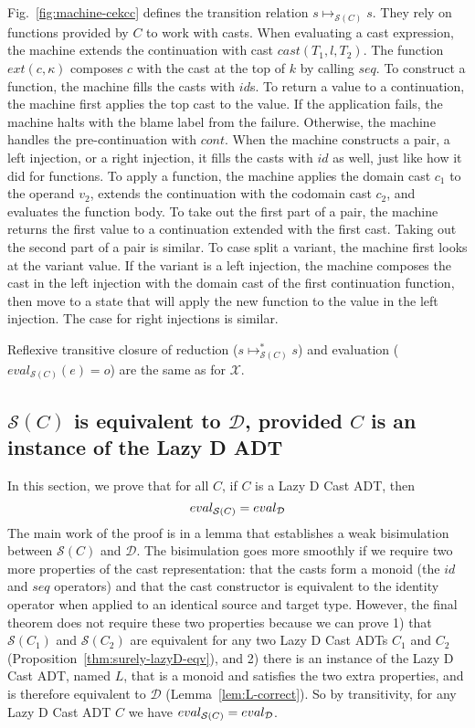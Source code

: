 \documentclass[acmsmall,review,anonymous]{acmart}\settopmatter{printfolios=true,printccs=false,printacmref=false}
\newcommand{\figref}[1]{Fig.~\ref{#1}}
\newcommand{\judgeSreduce}[3]{#2 \longmapsto_{\mathcal{S}(#1)} #3}
\newcommand{\judgeSreduceTrans}[3]{#2 \longmapsto_{\mathcal{S}(#1)}^{*} #3}
\newcommand{\judgeSeval}[3]{eval_{\mathcal{S}(#1)}(#2) = #3}
\newcommand{\ineffCEK}{\ensuremath{\mathcal{X}}}
\newcommand{\ineffCEKD}{\ensuremath{\mathcal{D}}}
\newcommand{\effCEK}[1]{\ensuremath{\mathcal{S}(#1)}}
\newcommand{\evalEqv}[2]{\ensuremath{eval_{\text{#1}} = eval_{\text{#2}}}}
\begin{document}
\figref{fig:machine-cekcc} defines the transition relation 
$\judgeSreduce{C}{s}{s}$. They rely on functions provided 
by $C$ to work with casts.
%
When evaluating a cast expression, the machine extends the continuation with 
cast $cast(T_1,l,T_2)$. The function $ext(c,\kappa)$ composes $c$ with the cast 
at the top of $k$ by calling $seq$.
%
To construct a function, the machine fills the casts with $id$s.
%
To return a value to a continuation, the machine first applies the top cast to 
the value. If the application fails, the machine halts with the blame label 
from the failure. Otherwise, the machine handles the pre-continuation with 
$cont$.
%
When the machine constructs a pair, a left injection, or a right injection, it 
fills the casts with $id$ as well, just like how it did for functions. 
%
To apply a function, the machine applies the domain cast $c_1$ to the 
operand $v_2$, extends the continuation with the codomain cast $c_2$, and 
evaluates the function body.
%
To take out the first part of a pair, the machine returns the first value to a 
continuation extended with the first cast. Taking out the second 
part of a pair is similar.
%
To case split a variant, the machine first looks at the variant value. If the 
variant is a left injection, the machine composes the cast in the left 
injection with the domain cast of the first continuation function, then move 
to a state that will apply the new function to the value in the left injection.
The case for right injections is similar.

Reflexive transitive closure of reduction ($\judgeSreduceTrans{C}{s}{s}$) and
evaluation ($\judgeSeval{C}{e}{o}$) are the same as for \ineffCEK.

\subsection{\effCEK{C} is equivalent to \ineffCEKD{}, provided $C$ is an instance of the Lazy D ADT}
\label{secc:framework:monoid-correct}

In this section, we prove that for all $C$, if $C$ is a Lazy D Cast
ADT, then
\[
  \evalEqv{\effCEK{C}}{\ineffCEKD}
\]
The main work of the proof is in a lemma that establishes a weak
bisimulation between \effCEK{C} and \ineffCEKD{}.  The bisimulation
goes more smoothly if we require two more properties of the cast
representation: that the casts form a monoid (the $id$ and $seq$
operators) and that the cast constructor is equivalent to the identity
operator when applied to an identical source and target type.
However, the final theorem does not require these two properties
because we can prove 1) that \effCEK{C_1} and \effCEK{C_2} are
equivalent for any two Lazy D Cast ADTs $C_1$ and $C_2$
(Proposition~\ref{thm:surely-lazyD-eqv}), and 2) there is an instance
of the Lazy D Cast ADT, named $L$, that is a monoid and satisfies the
two extra properties, and is therefore equivalent to \ineffCEKD{}
(Lemma~\ref{lem:L-correct}). So by transitivity, for any Lazy D Cast
ADT $C$ we have \evalEqv{\effCEK{C}}{\ineffCEKD}.
\end{document}
